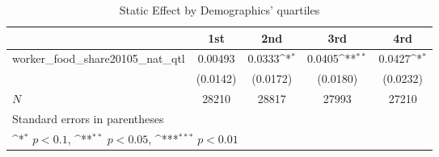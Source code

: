 \begin{table}[htbp]\centering
\def\sym#1{\ifmmode^{#1}\else\(^{#1}\)\fi}
\caption{Static Effect by Demographics' quartiles}
\begin{tabular}{l*{4}{c}}
\hline\hline
            &\multicolumn{1}{c}{1st}&\multicolumn{1}{c}{2nd}&\multicolumn{1}{c}{3rd}&\multicolumn{1}{c}{4rd}\\
\hline
worker\_food\_share20105\_nat\_qtl&     0.00493         &      0.0333\sym{*}  &      0.0405\sym{**} &      0.0427\sym{*}  \\
            &    (0.0142)         &    (0.0172)         &    (0.0180)         &    (0.0232)         \\
\hline
\(N\)       &       28210         &       28817         &       27993         &       27210         \\
\hline\hline
\multicolumn{5}{l}{\footnotesize Standard errors in parentheses}\\
\multicolumn{5}{l}{\footnotesize \sym{*} \(p<0.1\), \sym{**} \(p<0.05\), \sym{***} \(p<0.01\)}\\
\end{tabular}
\end{table}
